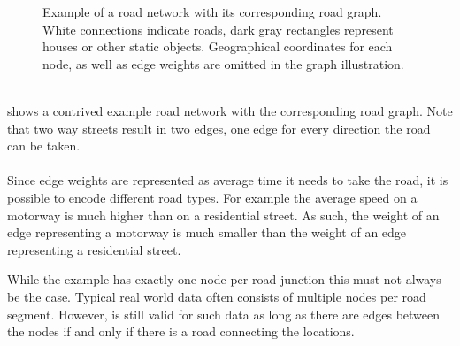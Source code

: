 \begin{figure}[!ht]
\begin{center}
		\end{center}
		\caption{Example of a road network with its corresponding road graph. White connections indicate roads,
			dark gray rectangles represent houses or other static objects.
			Geographical coordinates for each node, as well as edge weights are omitted in the graph illustration.}
		\label{roadGraphExample}
	\end{figure}\quad\\
	 shows a contrived example road network with the corresponding road graph.
	Note that two way streets result in two edges, one edge for every direction the road can be taken.\\\\
	Since edge weights are represented as average time it needs to take the road, it is possible to encode different road types.
	For example the average speed on a motorway is much higher than on a residential street. As such, the weight of an edge
	representing a motorway is much smaller than the weight of an edge representing a residential street.
	
	While the example has exactly one node per road junction this must not always be the case. Typical real world data often consists
	of multiple nodes per road segment. However,  is still valid for such data as long as there are edges
	between the nodes if and only if there is a road connecting the locations.

